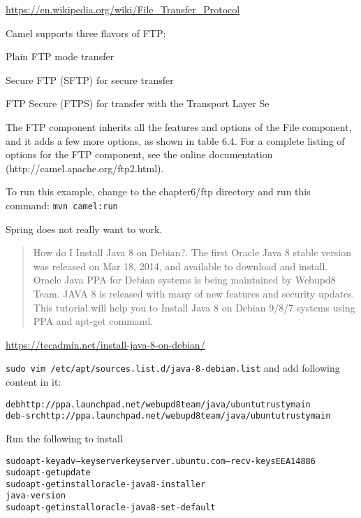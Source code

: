 \documentclass[Screen16to9,17pt]{foils}
\begin{document}
\url{https://en.wikipedia.org/wiki/File_Transfer_Protocol}


Camel supports three flavors of FTP:
\begin{list2}
\item Plain FTP mode transfer
\item  Secure FTP (SFTP) for secure transfer
\item  FTP Secure (FTPS) for transfer with the Transport Layer Se
\end{list2}

The FTP component inherits all the features and options of the File component, and it
adds a few more options, as shown in table 6.4. For a complete listing of options for the
FTP component, see the online documentation (http://camel.apache.org/ftp2.html).

To run this example, change to the chapter6/ftp directory and run this command:
\verb+mvn camel:run+

Spring does not really want to work.



\begin{quote}
How do I Install Java 8 on Debian?. The first Oracle Java 8 stable version was released on Mar 18, 2014, and available to download and install. Oracle Java PPA for Debian systems is being maintained by Webupd8 Team. JAVA 8 is released with many of new features and security updates. This tutorial will help you to Install Java 8 on Debian 9/8/7 systems using PPA and apt-get command.
\end{quote}

\url{https://tecadmin.net/install-java-8-on-debian/}


\verb+sudo vim /etc/apt/sources.list.d/java-8-debian.list+
and add following content in it:
\begin{alltt}
deb http://ppa.launchpad.net/webupd8team/java/ubuntu trusty main
deb-src http://ppa.launchpad.net/webupd8team/java/ubuntu trusty main
\end{alltt}

Run the following to install
\begin{alltt}
sudo apt-key adv --keyserver keyserver.ubuntu.com --recv-keys EEA14886
sudo apt-get update
sudo apt-get install oracle-java8-installer
java -version
sudo apt-get install oracle-java8-set-default
\end{alltt}
\end{document}
